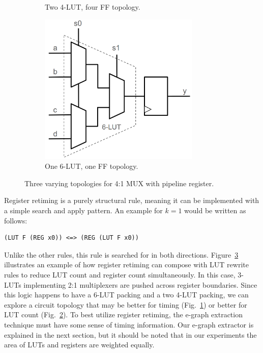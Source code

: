 \begin{figure}[tb]
\begin{subfigure}{0.38\textwidth}
        \caption{Two 4-LUT, four FF topology.}\label{fig:retiming:b}
    \end{subfigure}
    \begin{subfigure}{0.30\textwidth}
        \centering
        \includegraphics[width=0.84\textwidth]{img/mux_4_1_retime.png}
        \caption{One 6-LUT, one FF topology.}\label{fig:retiming:c}
    \end{subfigure}
    \caption{Three varying topologies for 4:1 MUX with pipeline register.}\label{fig:retiming}
\end{figure}

Register retiming is a purely structural rule, meaning it can be implemented
with a simple search and apply pattern. An example for $k=1$ would be written
as follows:

\begin{lstlisting}
(LUT F (REG x0)) <=> (REG (LUT F x0))
\end{lstlisting}

Unlike the other rules, this rule is searched for in both directions.
Figure~\ref{fig:retiming} illustrates an example of how register retiming can
compose with LUT rewrite rules to reduce LUT count and register count
simultaneously. In this case, 3-LUTs implementing 2:1 multiplexers are pushed
across register boundaries. Since this logic happens to have a 6-LUT packing
and a two 4-LUT packing, we can explore a circuit topology that may be better
for timing (Fig.~\ref{fig:retiming:b}) or better for LUT count
(Fig.~\ref{fig:retiming:c}). To best utilize register retiming, the e-graph
extraction technique must have some sense of timing information. Our e-graph
extractor is explained in the next section, but it should be noted that in our
experiments the area of LUTs and registers are weighted equally.